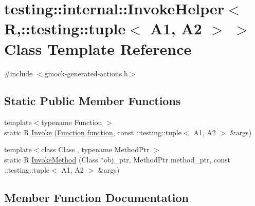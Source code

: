 \hypertarget{classtesting_1_1internal_1_1_invoke_helper_3_01_r_00_1_1testing_1_1tuple_3_01_a1_00_01_a2_01_4_01_4}{}\section{testing\+:\+:internal\+:\+:Invoke\+Helper$<$ R,\+:\+:testing\+:\+:tuple$<$ A1, A2 $>$ $>$ Class Template Reference}
\label{classtesting_1_1internal_1_1_invoke_helper_3_01_r_00_1_1testing_1_1tuple_3_01_a1_00_01_a2_01_4_01_4}


{\ttfamily \#include $<$gmock-\/generated-\/actions.\+h$>$}

\subsection*{Static Public Member Functions}
\begin{DoxyCompactItemize}
\item 
{\footnotesize template$<$typename Function $>$ }\\static R \hyperlink{classtesting_1_1internal_1_1_invoke_helper_3_01_r_00_1_1testing_1_1tuple_3_01_a1_00_01_a2_01_4_01_4_abb388db2d26daff9eebca8aa643ab978}{Invoke} (\hyperlink{structtesting_1_1internal_1_1_function}{Function} \hyperlink{_07copy_08_2_undistort_image_8m_aa0b19300b507d475ab9f1525750bc11f}{function}, const \+::testing\+::tuple$<$ A1, A2 $>$ \&args)
\item 
{\footnotesize template$<$class Class , typename Method\+Ptr $>$ }\\static R \hyperlink{classtesting_1_1internal_1_1_invoke_helper_3_01_r_00_1_1testing_1_1tuple_3_01_a1_00_01_a2_01_4_01_4_ab8b7fd635406845405c71711655df4c7}{Invoke\+Method} (Class $\ast$obj\+\_\+ptr, Method\+Ptr method\+\_\+ptr, const \+::testing\+::tuple$<$ A1, A2 $>$ \&args)
\end{DoxyCompactItemize}


\subsection{Member Function Documentation}
